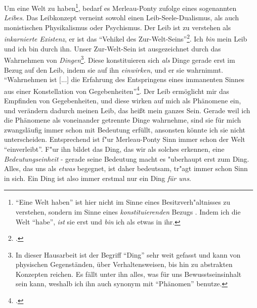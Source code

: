 \documentclass[a4paper, 12pt]{article}
\begin{document}
\begin{onehalfspace}
Um eine Welt zu haben\footnote{"`Eine Welt haben"' ist hier nicht im Sinne eines Besitzverh"altnisses zu verstehen, sondern im Sinne eines \emph{konstituierenden} Bezugs . Indem ich die Welt "`habe"', \emph{ist} sie erst und \emph{bin} ich als etwas in ihr.}, bedarf es Merleau-Ponty zufolge eines sogenannten \emph{Leibes}. Das Leibkonzept verneint sowohl einen Leib-Seele-Dualismus, als auch monistischen Physikalismus oder Psychismus. Der Leib ist zu verstehen als \emph{inkarnierte Existenz}, er ist das "`Vehikel des Zur-Welt-Seins"'\footnote{\Cite[Siehe][S. 106]{merleau1966phanomenologie}.}. Ich \emph{bin} mein Leib und ich bin durch ihn. Unser Zur-Welt-Sein ist ausgezeichnet durch das Wahrnehmen von \emph{Dingen}\footnote{In dieser Hausarbeit ist der Begriff "`Ding"' sehr weit gefasst und kann von physischen Gegenständen, über Verhaltensweisen, bis hin zu abstrakten Konzepten reichen. Es fällt unter ihn alles, was für uns Bewusstseinsinhalt sein kann, weshalb ich ihn auch synonym mit "`Phänomen"' benutze.}. Diese konstituieren sich \emph{als} Dinge gerade erst im Bezug auf den Leib, indem sie auf ihn \emph{einwirken}, und er sie wahrnimmt. "`Wahrnehmen ist [...] die Erfahrung des Entspringens eines immanenten Sinnes aus einer Konstellation von Gegebenheiten"'\footnote{\Cite[Siehe][S. 42]{merleau1966phanomenologie}.}. Der Leib ermöglicht mir das Empfinden von Gegebenheiten, und diese wirken auf mich als Phänomene ein, und verändern dadurch meinen Leib, das heißt mein ganzes Sein. Gerade weil ich die Phänomene als voneinander getrennte Dinge wahrnehme, sind sie für mich zwangsläufig immer schon mit Bedeutung erfüllt, ansonsten könnte ich sie nicht unterscheiden. Entsprechend ist f"ur Merleau-Ponty Sinn immer schon der Welt "`einverleibt"'. F"ur ihn bildet das Ding, das wir als solches erkennen, eine \emph{Bedeutungseinheit} - gerade seine Bedeutung macht es "uberhaupt erst zum Ding. Alles, das uns als \emph{etwas} begegnet, ist daher bedeutsam, tr"agt immer schon Sinn in sich. Ein Ding ist also immer erstmal nur ein Ding \emph{für uns}.


\end{onehalfspace}
\end{document}
